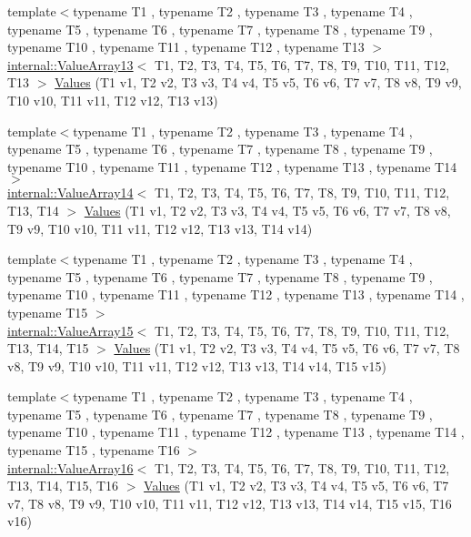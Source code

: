 \begin{DoxyCompactItemize}
\item 
{\footnotesize template$<$typename T1 , typename T2 , typename T3 , typename T4 , typename T5 , typename T6 , typename T7 , typename T8 , typename T9 , typename T10 , typename T11 , typename T12 , typename T13 $>$ }\\\mbox{\hyperlink{classtesting_1_1internal_1_1_value_array13}{internal\+::\+Value\+Array13}}$<$ T1, T2, T3, T4, T5, T6, T7, T8, T9, T10, T11, T12, T13 $>$ \mbox{\hyperlink{namespacetesting_aa13a09e043383c947042ba726d25d47c}{Values}} (T1 v1, T2 v2, T3 v3, T4 v4, T5 v5, T6 v6, T7 v7, T8 v8, T9 v9, T10 v10, T11 v11, T12 v12, T13 v13)
\item 
{\footnotesize template$<$typename T1 , typename T2 , typename T3 , typename T4 , typename T5 , typename T6 , typename T7 , typename T8 , typename T9 , typename T10 , typename T11 , typename T12 , typename T13 , typename T14 $>$ }\\\mbox{\hyperlink{classtesting_1_1internal_1_1_value_array14}{internal\+::\+Value\+Array14}}$<$ T1, T2, T3, T4, T5, T6, T7, T8, T9, T10, T11, T12, T13, T14 $>$ \mbox{\hyperlink{namespacetesting_a2d00ed785e0e796e6f36dc79c051dc76}{Values}} (T1 v1, T2 v2, T3 v3, T4 v4, T5 v5, T6 v6, T7 v7, T8 v8, T9 v9, T10 v10, T11 v11, T12 v12, T13 v13, T14 v14)
\item 
{\footnotesize template$<$typename T1 , typename T2 , typename T3 , typename T4 , typename T5 , typename T6 , typename T7 , typename T8 , typename T9 , typename T10 , typename T11 , typename T12 , typename T13 , typename T14 , typename T15 $>$ }\\\mbox{\hyperlink{classtesting_1_1internal_1_1_value_array15}{internal\+::\+Value\+Array15}}$<$ T1, T2, T3, T4, T5, T6, T7, T8, T9, T10, T11, T12, T13, T14, T15 $>$ \mbox{\hyperlink{namespacetesting_ab0c1943e4f680df0d92c695ed0ac36df}{Values}} (T1 v1, T2 v2, T3 v3, T4 v4, T5 v5, T6 v6, T7 v7, T8 v8, T9 v9, T10 v10, T11 v11, T12 v12, T13 v13, T14 v14, T15 v15)
\item 
{\footnotesize template$<$typename T1 , typename T2 , typename T3 , typename T4 , typename T5 , typename T6 , typename T7 , typename T8 , typename T9 , typename T10 , typename T11 , typename T12 , typename T13 , typename T14 , typename T15 , typename T16 $>$ }\\\mbox{\hyperlink{classtesting_1_1internal_1_1_value_array16}{internal\+::\+Value\+Array16}}$<$ T1, T2, T3, T4, T5, T6, T7, T8, T9, T10, T11, T12, T13, T14, T15, T16 $>$ \mbox{\hyperlink{namespacetesting_afebcdc503d4a99cae5924523dcfd02e1}{Values}} (T1 v1, T2 v2, T3 v3, T4 v4, T5 v5, T6 v6, T7 v7, T8 v8, T9 v9, T10 v10, T11 v11, T12 v12, T13 v13, T14 v14, T15 v15, T16 v16)

\end{DoxyCompactItemize}
